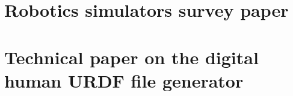 \documentclass[12pt,a4paper,twoside]{article}
\begin{document}
\newpage{}




\newpage{}
\begin{appendices}
\section{Robotics simulators survey paper }
\label{app:survey}
\newpage


\section{Technical paper on the digital human URDF file generator}
\label{app:dhm urdf}
\newpage

\end{appendices}
\end{document}
